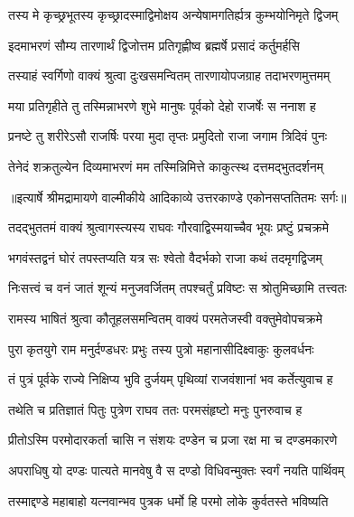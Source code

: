 \twolineshloka
{तस्य मे कृच्छ्रभूतस्य कृच्छ्रादस्माद्विमोक्षय}
{अन्येषामगतिर्ह्यत्र कुम्भयोनिमृते द्विजम्} %

\twolineshloka
{इदमाभरणं सौम्य तारणार्थं द्विजोत्तम}
{प्रतिगृह्णीष्व ब्रह्मर्षे प्रसादं कर्तुमर्हसि} %

\twolineshloka
{तस्याहं स्वर्गिणो वाक्यं श्रुत्वा दुःखसमन्वितम्}
{तारणायोपजग्राह तदाभरणमुत्तमम्} %

\twolineshloka
{मया प्रतिगृहीते तु तस्मिन्नाभरणे शुभे}
{मानुषः पूर्वको देहो राजर्षेः स ननाश ह} %

\twolineshloka
{प्रनष्टे तु शरीरेऽसौ राजर्षिः परया मुदा}
{तृप्तः प्रमुदितो राजा जगाम त्रिदिवं पुनः} %

\twolineshloka
{तेनेदं शक्रतुल्येन दिव्यमाभरणं मम}
{तस्मिन्निमित्ते काकुत्स्थ दत्तमद्भुतदर्शनम्} %


{॥इत्यार्षे श्रीमद्रामायणे वाल्मीकीये आदिकाव्ये उत्तरकाण्डे एकोनसप्ततितमः सर्गः॥}


\twolineshloka
{तदद्भुततमं वाक्यं श्रुत्वागस्त्यस्य राघवः}
{गौरवाद्विस्मयाच्चैव भूयः प्रष्टुं प्रचक्रमे} %

\twolineshloka
{भगवंस्तद्वनं घोरं तपस्तप्यति यत्र सः}
{श्वेतो वैदर्भको राजा कथं तदमृगद्विजम्} %

\twolineshloka
{निःसत्त्वं च वनं जातं शून्यं मनुजवर्जितम्}
{तपश्चर्तुं प्रविष्टः स श्रोतुमिच्छामि तत्त्वतः} %

\twolineshloka
{रामस्य भाषितं श्रुत्वा कौतूहलसमन्वितम्}
{वाक्यं परमतेजस्वी वक्तुमेवोपचक्रमे} %

\twolineshloka
{पुरा कृतयुगे राम मनुर्दण्डधरः प्रभुः}
{तस्य पुत्रो महानासीदिक्ष्वाकुः कुलवर्धनः} %

\twolineshloka
{तं पुत्रं पूर्वके राज्ये निक्षिप्य भुवि दुर्जयम्}
{पृथिव्यां राजवंशानां भव कर्तेत्युवाच ह} %

\twolineshloka
{तथेति च प्रतिज्ञातं पितुः पुत्रेण राघव}
{ततः परमसंहृष्टो मनुः पुनरुवाच ह} %

\twolineshloka
{प्रीतोऽस्मि परमोदारकर्ता चासि न संशयः}
{दण्डेन च प्रजा रक्ष मा च दण्डमकारणे} %

\twolineshloka
{अपराधिषु यो दण्डः पात्यते मानवेषु वै}
{स दण्डो विधिवन्मुक्तः स्वर्गं नयति पार्थिवम्} %

\twolineshloka
{तस्माद्दण्डे महाबाहो यत्नवान्भव पुत्रक}
{धर्मो हि परमो लोके कुर्वतस्ते भविष्यति} %

